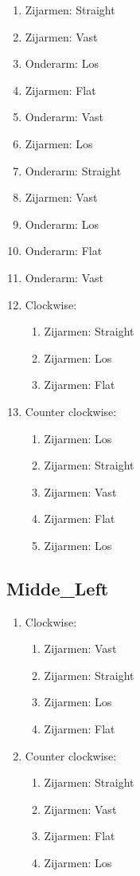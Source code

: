 \begin{enumerate}
	\item Zijarmen: Straight
	\item Zijarmen: Vast
	\item Onderarm: Los
	\item Zijarmen: Flat
	\item Onderarm: Vast
	\item Zijarmen: Los
	\item Onderarm: Straight
	\item Zijarmen: Vast
	\item Onderarm: Los
	\item Onderarm: Flat
	\item Onderarm: Vast
	\item Clockwise:
	\begin{enumerate}
		\item Zijarmen: Straight
		\item Zijarmen: Los
		\item Zijarmen: Flat
	\end{enumerate}
	\item Counter clockwise:
	\begin{enumerate}
		\item Zijarmen: Los
		\item Zijarmen: Straight
		\item Zijarmen: Vast
		\item Zijarmen: Flat
		\item Zijarmen: Los
	\end{enumerate}
\end{enumerate}
\newpage

\subsection{Midde\_Left}

\begin{enumerate}
	\item Clockwise:
	\begin{enumerate}
		\item Zijarmen: Vast
		\item Zijarmen: Straight
		\item Zijarmen: Los
		\item Zijarmen: Flat
	\end{enumerate}
	\item Counter clockwise:
	\begin{enumerate}
		\item Zijarmen: Straight
		\item Zijarmen: Vast
		\item Zijarmen: Flat
		\item Zijarmen: Los
	\end{enumerate}
\end{enumerate}
\newpage

